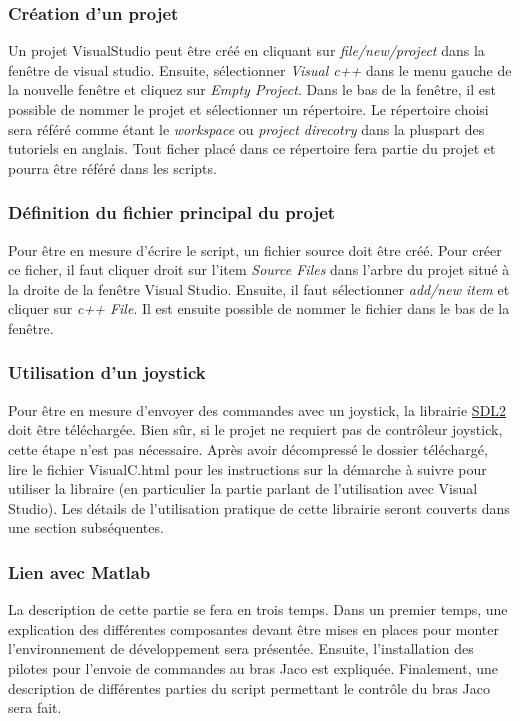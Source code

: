 \subsubsection{Création d'un projet}
Un projet VisualStudio peut être créé en cliquant sur \textit{file/new/project} dans la fenêtre de visual studio.
Ensuite, sélectionner \textit{Visual c++} dans le menu gauche de la nouvelle fenêtre et cliquez sur \textit{Empty Project}.
Dans le bas de la fenêtre, il est possible de nommer le projet et sélectionner un répertoire.
Le répertoire choisi sera référé comme étant le \textit{workspace} ou \textit{project direcotry} dans la pluspart des tutoriels en anglais.
Tout ficher placé dans ce répertoire fera partie du projet et pourra être référé dans les scripts.

\subsubsection{Définition du fichier principal du projet}
Pour être en mesure d'écrire le script, un fichier source doit être créé.
Pour créer ce ficher, il faut cliquer droit sur l'item \textit{Source Files} dans l'arbre du projet situé à la droite de la fenêtre Visual Studio.
Ensuite, il faut sélectionner \textit{add/new item} et cliquer sur \textit{c++ File}.
Il est ensuite possible de nommer le fichier dans le bas de la fenêtre.

\subsubsection{Utilisation d'un joystick}
Pour être en mesure d'envoyer des commandes avec un joystick, la librairie \href{https://www.libsdl.org/release/SDL2-2.0.7.zip
}{SDL2} doit être téléchargée.
Bien sûr, si le projet ne requiert pas de contrôleur joystick, cette étape n'est pas nécessaire.
Après avoir décompressé le dossier téléchargé, lire le fichier VisualC.html pour les instructions sur la démarche à suivre pour utiliser la libraire (en particulier la partie parlant de l'utilisation avec Visual Studio).
Les détails de l'utilisation pratique de cette librairie seront couverts dans une section subséquentes.

\subsubsection{Lien avec Matlab}

La description de cette partie se fera en trois temps.
Dans un premier temps, une explication des différentes composantes devant être mises en places pour monter l'environnement de développement sera présentée.
Ensuite, l'installation des pilotes pour l'envoie de commandes au bras Jaco est expliquée.
Finalement, une description de différentes parties du script permettant le contrôle du bras Jaco sera fait.
